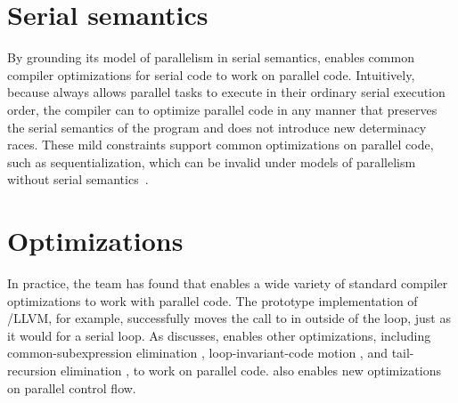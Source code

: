 \section{Serial semantics}

By grounding its model of parallelism in serial semantics, \tapir
enables common compiler optimizations for serial code to work on
parallel code.  Intuitively, because \tapir always allows parallel
tasks to execute in their ordinary serial execution order, the
compiler can to optimize parallel code in any manner that preserves
the serial semantics of the program and does not introduce new
determinacy races.  These mild constraints support common
optimizations on parallel code, such as sequentialization, which can
be invalid under models of parallelism without serial
semantics~\cite{VafeiadisBaCh15}.

\section{Optimizations}

In practice, the \tapir team has found that \tapir enables a wide variety of
standard compiler optimizations to work with parallel code.  The
prototype implementation of \tapir/LLVM, for example, successfully
moves the call to  in  outside of the
loop, just as it would for a serial  loop.  As 
discusses, \tapir enables other optimizations, including
common-subexpression elimination \cite[Sec.~12.2]{Muchnick97},
loop-invariant-code motion \cite[Sec.~13.2]{Muchnick97}, and
tail-recursion elimination \cite[Sec.~15.1]{Muchnick97}, to work on
parallel code.  \tapir also enables new optimizations on parallel
control flow.

